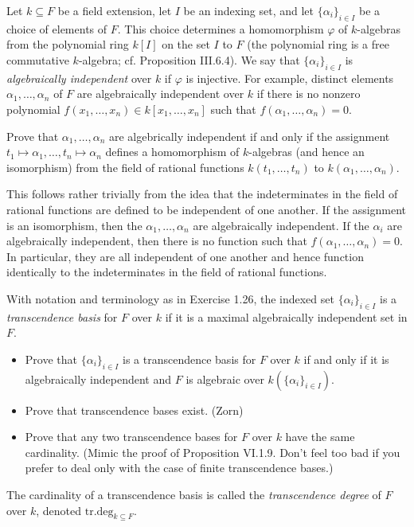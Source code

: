 \documentclass[../../master.tex]{subfiles}
\begin{document}
\begin{problem}
    Let $k \subseteq F$ be a field extension, let $I$ be an indexing set, and let $\{\alpha_i\}_{i \in I}$ be a choice of elements of $F$.
    This choice determines a homomorphism $\varphi$ of $k$-algebras from the polynomial ring $k[I]$ on the set $I$ to $F$ (the polynomial ring is a free commutative $k$-algebra; cf. Proposition III.6.4).
    We say that $\{\alpha_i\}_{i \in I}$ is \textit{algebraically independent} over $k$ if $\varphi$ is injective.
    For example, distinct elements $\alpha_1, \ldots, \alpha_n$ of $F$ are algebraically independent over $k$ if there is no nonzero polynomial $f(x_1, \ldots, x_n) \in k[x_1, \ldots, x_n]$ such that $f(\alpha_1, \ldots, \alpha_n) = 0$.

    Prove that $\alpha_1, \ldots, \alpha_n$ are algebrically independent if and only if the assignment $t_1 \mapsto \alpha_1, \ldots, t_n \mapsto \alpha_n$ defines a homomorphism of $k$-algebras (and hence an isomorphism) from the field of rational functions $k(t_1, \ldots, t_n)$ to $k(\alpha_1, \ldots, \alpha_n)$.
\end{problem}

\begin{solution}
    This follows rather trivially from the idea that the indeterminates in the field of rational functions are defined to be independent of one another.
    If the assignment is an isomorphism, then the $\alpha_1, \ldots, \alpha_n$ are algebraically independent.
    If the $\alpha_i$ are algebraically independent, then there is no function such that $f(\alpha_1, \ldots, \alpha_n) = 0$.
    In particular, they are all independent of one another and hence function identically to the indeterminates in the field of rational functions.
\end{solution}

\begin{problem}
    With notation and terminology as in Exercise 1.26, the indexed set $\{\alpha_i\}_{i \in I}$ is a \textit{transcendence basis} for $F$ over $k$ if it is a maximal algebraically independent set in $F$.
    \begin{itemize}
        \item Prove that $\{\alpha_i\}_{i \in I}$ is a transcendence basis for $F$ over $k$ if and only if it is algebraically independent and $F$ is algebraic over $k(\{\alpha_i\}_{i \in I})$.
        \item Prove that transcendence bases exist. (Zorn)
        \item Prove that any two transcendence bases for $F$ over $k$ have the same cardinality.
            (Mimic the proof of Proposition VI.1.9.
            Don't feel too bad if you prefer to deal only with the case of finite transcendence bases.)
    \end{itemize}
    The cardinality of a transcendence basis is called the \textit{transcendence degree} of $F$ over $k$, denoted $\text{tr.deg}_{k \subseteq F}$.
\end{problem}
\end{document}
